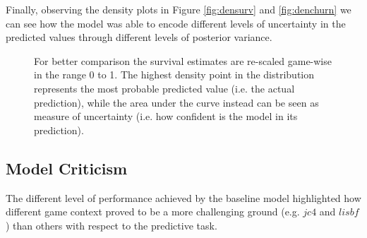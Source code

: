 Finally, observing the density plots in Figure \ref{fig:densurv} and \ref{fig:denchurn} we can see how the model was able to encode different levels of uncertainty in the predicted values through different levels of posterior variance.

\begin{figure}[h]
  \centering
  \hfill
  \caption[\textbf{Distribution of the BM predictions for six random users, one for each game}]{For better comparison the survival estimates are re-scaled game-wise in the range 0 to 1. The highest density point in the distribution represents the most probable predicted value (i.e. the actual prediction),  while the area under the curve instead can be seen as measure of uncertainty (i.e. how confident is the model in its prediction).}
  \label{distestimations}
\end{figure}



\subsection{Model Criticism}
\label{model_criticims_1}
The different level of performance achieved by the baseline model highlighted how different game context proved to be a more challenging ground (e.g. $jc4$ and $lisbf$) than others with respect to the predictive task. 


